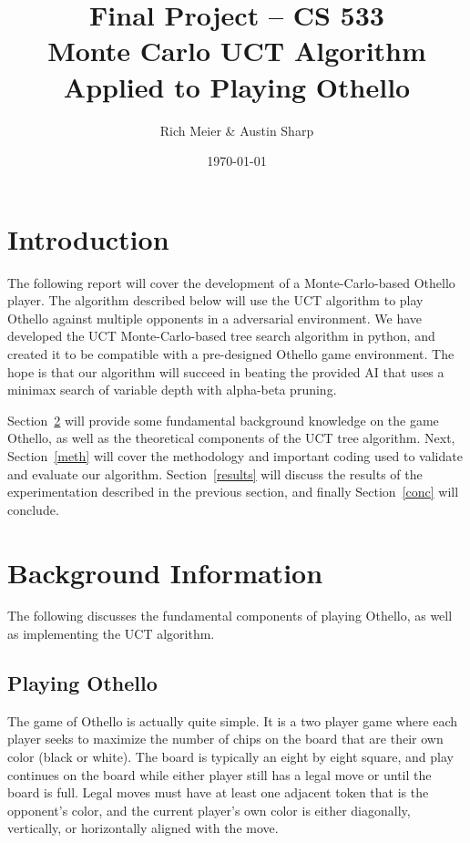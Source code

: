 \documentclass[12pt,letterpaper]{article}
\begin{document}
\title{\vspace{-1in}Final Project -- CS 533 \\ Monte Carlo UCT Algorithm Applied to Playing Othello}
\author{Rich Meier \& Austin Sharp}
\date{\today}
\maketitle

\vspace{-.5in}
\section{Introduction}
The following report will cover the development of a Monte-Carlo-based Othello player. The algorithm described below will use the UCT algorithm to play Othello against multiple opponents in a adversarial environment. We have developed the UCT Monte-Carlo-based tree search algorithm in python, and created it to be compatible with a pre-designed Othello game environment. The hope is that our algorithm will succeed in beating the provided AI that uses a minimax search of variable depth with alpha-beta pruning.

Section~\ref{back} will provide some fundamental background knowledge on the game Othello, as well as the theoretical components of the UCT tree algorithm.  Next, Section~\ref{meth} will cover the methodology and important coding used to validate and evaluate our algorithm. Section~\ref{results} will discuss the results of the experimentation described in the previous section, and finally Section~\ref{conc} will conclude.

\section{Background Information}
\label{back}

The following discusses the fundamental components of playing Othello, as well as implementing the UCT algorithm.

\subsection{Playing Othello}

The game of Othello is actually quite simple. It is a two player game where each player seeks to maximize the number of chips on the board that are their own color (black or white). The board is typically an eight by eight square, and play continues on the board while either player still has a legal move or until the board is full. Legal moves must have at least one adjacent token that is the opponent's color, and the current player's own color is either diagonally, vertically, or horizontally aligned with the move.  
\end{document}
